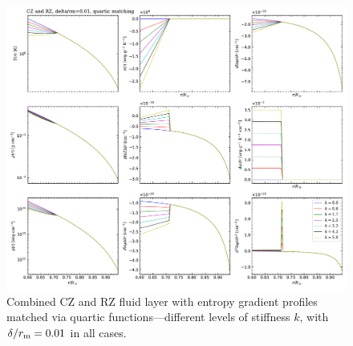 \documentclass[12pt]{article} %
\newcommand{\rrm}{r_{\rm{m}}}
\begin{document}
\begin{figure}
	\includegraphics[scale=0.6]{figures/CZ_RZ_quartmatch_vs_k.pdf}
	\caption{Combined CZ and RZ fluid layer with entropy gradient profiles matched via quartic functions---different levels of stiffness $k$, with $\delta/\rrm=0.01$ in all cases.}
	\label{fig:CZ_RZ_quartmatch_vs_k}	
\end{figure}
\end{document}
